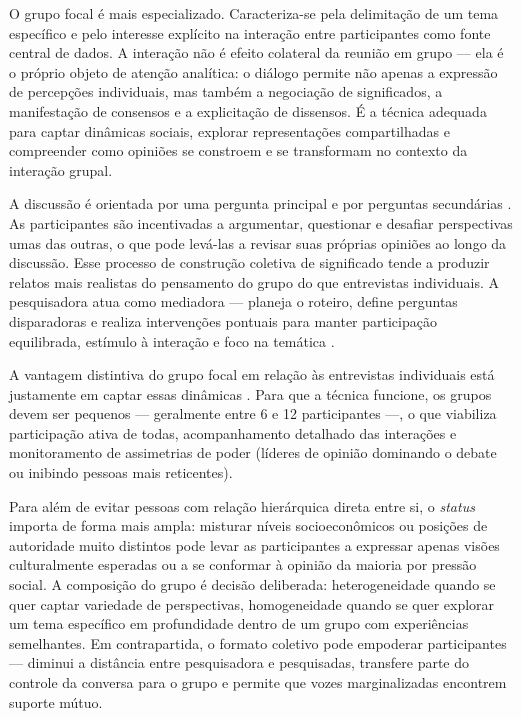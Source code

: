\documentclass[12pt, a4paper, openany]{book}
\begin{document}
O grupo focal \'e mais especializado. Caracteriza-se pela delimita\c{c}\~ao de um tema espec\'ifico e pelo interesse expl\'icito na intera\c{c}\~ao entre participantes como fonte central de dados. A intera\c{c}\~ao n\~ao \'e efeito colateral da reuni\~ao em grupo --- ela \'e o pr\'oprio objeto de aten\c{c}\~ao anal\'itica: o di\'alogo permite n\~ao apenas a express\~ao de percep\c{c}\~oes individuais, mas tamb\'em a negocia\c{c}\~ao de significados, a manifesta\c{c}\~ao de consensos e a explicita\c{c}\~ao de dissensos. \'E a t\'ecnica adequada para captar din\^amicas sociais, explorar representa\c{c}\~oes compartilhadas e compreender como opini\~oes se constroem e se transformam no contexto da intera\c{c}\~ao grupal.

A discuss\~ao \'e orientada por uma pergunta principal e por perguntas secund\'arias \citep{almeida2016grupos}. As participantes s\~ao incentivadas a argumentar, questionar e desafiar perspectivas umas das outras, o que pode lev\'a-las a revisar suas pr\'oprias opini\~oes ao longo da discuss\~ao. Esse processo de constru\c{c}\~ao coletiva de significado tende a produzir relatos mais realistas do pensamento do grupo do que entrevistas individuais. A pesquisadora atua como mediadora --- planeja o roteiro, define perguntas disparadoras e realiza interven\c{c}\~oes pontuais para manter participa\c{c}\~ao equilibrada, est\'imulo \`a intera\c{c}\~ao e foco na tem\'atica \citep{jimenez2012entrevista,bryman2012social}.

A vantagem distintiva do grupo focal em rela\c{c}\~ao \`as entrevistas individuais est\'a justamente em captar essas din\^amicas \citep{silva2021modera}. Para que a t\'ecnica funcione, os grupos devem ser pequenos --- geralmente entre 6 e 12 participantes ---, o que viabiliza participa\c{c}\~ao ativa de todas, acompanhamento detalhado das intera\c{c}\~oes e monitoramento de assimetrias de poder (l\'ideres de opini\~ao dominando o debate ou inibindo pessoas mais reticentes).

Para al\'em de evitar pessoas com rela\c{c}\~ao hier\'arquica direta entre si, o \textit{status} importa de forma mais ampla: misturar n\'iveis socioecon\^omicos ou posi\c{c}\~oes de autoridade muito distintos pode levar as participantes a expressar apenas vis\~oes culturalmente esperadas ou a se conformar \`a opini\~ao da maioria por press\~ao social. A composi\c{c}\~ao do grupo \'e decis\~ao deliberada: heterogeneidade quando se quer captar variedade de perspectivas, homogeneidade quando se quer explorar um tema espec\'ifico em profundidade dentro de um grupo com experi\^encias semelhantes. Em contrapartida, o formato coletivo pode empoderar participantes --- diminui a dist\^ancia entre pesquisadora e pesquisadas, transfere parte do controle da conversa para o grupo e permite que vozes marginalizadas encontrem suporte m\'utuo.
\end{document}
